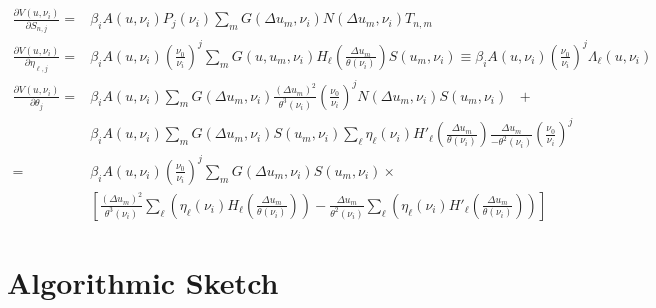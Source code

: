 \documentclass[]{article}
\begin{document}
\begin{align}
\frac{\partial V(u,\nu_i)}{\partial S_{n,j}} =& \beta_i A(u,\nu_i) P_j(\nu_i) \sum_m  G(\Delta u_m,\nu_i) N(\Delta u_m,\nu_i) T_{n,m} \\ %
\frac{\partial V(u,\nu_i)}{\partial \eta_{\ell,j}} =& \beta_i A(u,\nu_i)\left(\frac{\nu_0}{\nu_i}\right)^j \sum_m G (u,u_m,\nu_i)  H_\ell\left(\frac{\Delta u_m}{\theta(\nu_i)}\right) S(u_m,\nu_i) \equiv \beta_i A(u,\nu_i) \left(\frac{\nu_0}{\nu_i}\right)^j \Lambda_\ell(u,\nu_i) \label{eq:dVdeta}\\
\frac{\partial V(u,\nu_i)}{\partial \theta_j} =& \beta_i A(u,\nu_i) \sum_m G(\Delta u_m,\nu_i) \frac{(\Delta u_m)^2}{\theta^3(\nu_i)} \left(\frac{\nu_0}{\nu_i}\right)^j N(\Delta u_m,\nu_i) S(u_m, \nu_i) \mbox{ }+ \nonumber \\
& \beta_i A(u,\nu_i) \sum_m G(\Delta u_m,\nu_i) S(u_m, \nu_i) \sum_\ell \eta_\ell(\nu_i) H'_\ell \left(\frac{\Delta u_m}{\theta(\nu_i)}\right) \frac{\Delta u_m}{-\theta^2(\nu_i)} \left(\frac{\nu_0}{\nu_i}\right)^j \nonumber \\
= & \beta_i A(u,\nu_i) \left(\frac{\nu_0}{\nu_i}\right)^j \sum_m G(\Delta u_m,\nu_i) S(u_m,\nu_i) \times \nonumber \\
& \left[ \frac{(\Delta u_m)^2}{\theta^{3}(\nu_i)} 
\sum_\ell \left(\eta_\ell(\nu_i) H_\ell  \left(\frac{\Delta u_m}{\theta(\nu_i)}\right) \right) -  \frac{\Delta u_m}{\theta^2(\nu_i)} \sum_\ell \left(\eta_\ell(\nu_i) H'_\ell\left(\frac{\Delta u_m}{\theta(\nu_i)}\right) \right) \right] \label{eq:dVdth }
\end{align}

\section{Algorithmic Sketch}
\end{document}
